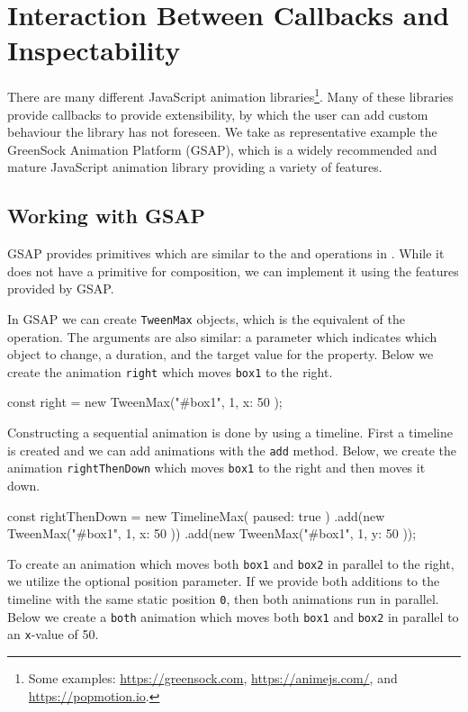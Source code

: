 \section{Interaction Between Callbacks and Inspectability}
\label{sec:evaluation}

There are many different JavaScript animation libraries\footnote{Some examples: \url{https://greensock.com}, \url{https://animejs.com/}, and \url{https://popmotion.io}.}. Many of these libraries provide callbacks to provide extensibility, by which the user can add custom behaviour the library has not foreseen. We take as representative example the GreenSock Animation Platform (GSAP), which is a widely recommended and mature JavaScript animation library providing a variety of features.

\subsection{Working with GSAP}

GSAP provides primitives which are similar to the  and  operations in \dsl{}. While it does not have a primitive for  composition, we can implement it using the features provided by GSAP.

In GSAP we can create \texttt{TweenMax} objects, which is the equivalent of the  operation. The arguments are also similar: a parameter which indicates which object to change, a duration, and the target value for the property. Below we create the animation \texttt{right} which moves \texttt{box1} to the right.

\begin{js}
const right = new TweenMax("#box1", 1, { x: 50 });
\end{js}

Constructing a sequential animation is done by using a timeline. First a timeline is created and we can add animations with the \texttt{add} method. Below, we create the animation \texttt{rightThenDown} which moves \texttt{box1} to the right and then moves it down.

\begin{js}
const rightThenDown = new TimelineMax({ paused: true })
  .add(new TweenMax("#box1", 1, { x: 50 }))
  .add(new TweenMax("#box1", 1, { y: 50 }));
\end{js}

To create an animation which moves both \texttt{box1} and \texttt{box2} in parallel to the right, we utilize the optional position parameter. If we provide both additions to the timeline with the same static position \texttt{0}, then both animations run in parallel. Below we create a \texttt{both} animation which moves both \texttt{box1} and \texttt{box2} in parallel to an \texttt{x}-value of 50.

